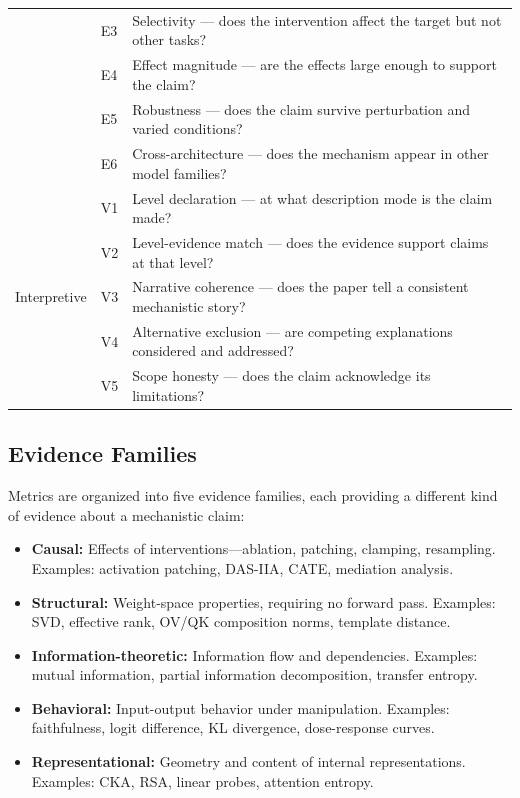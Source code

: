 \documentclass[10pt]{article}
\begin{document}
\begin{table}[t]
\begin{tabular}{@{}llp{7.5cm}@{}}
& E3 & Selectivity --- does the intervention affect the target but not other tasks? \\
& E4 & Effect magnitude --- are the effects large enough to support the claim? \\
& E5 & Robustness --- does the claim survive perturbation and varied conditions? \\
& E6 & Cross-architecture --- does the mechanism appear in other model families? \\
\midrule
\multirow{5}{*}{Interpretive} & V1 & Level declaration --- at what description mode is the claim made? \\
& V2 & Level-evidence match --- does the evidence support claims at that level? \\
& V3 & Narrative coherence --- does the paper tell a consistent mechanistic story? \\
& V4 & Alternative exclusion --- are competing explanations considered and addressed? \\
& V5 & Scope honesty --- does the claim acknowledge its limitations? \\
\bottomrule
\end{tabular}
\end{table}

\subsection{Evidence Families}
\label{sec:evidence-families}

Metrics are organized into five evidence families, each providing a different kind of evidence about a mechanistic claim:

\begin{itemize}[nosep]
    \item \textbf{Causal:} Effects of interventions---ablation, patching, clamping, resampling. Examples: activation patching, DAS-IIA, CATE, mediation analysis.
    \item \textbf{Structural:} Weight-space properties, requiring no forward pass. Examples: SVD, effective rank, OV/QK composition norms, template distance.
    \item \textbf{Information-theoretic:} Information flow and dependencies. Examples: mutual information, partial information decomposition, transfer entropy.
    \item \textbf{Behavioral:} Input-output behavior under manipulation. Examples: faithfulness, logit difference, KL divergence, dose-response curves.
    \item \textbf{Representational:} Geometry and content of internal representations. Examples: CKA, RSA, linear probes, attention entropy.
\end{itemize}
\end{document}
